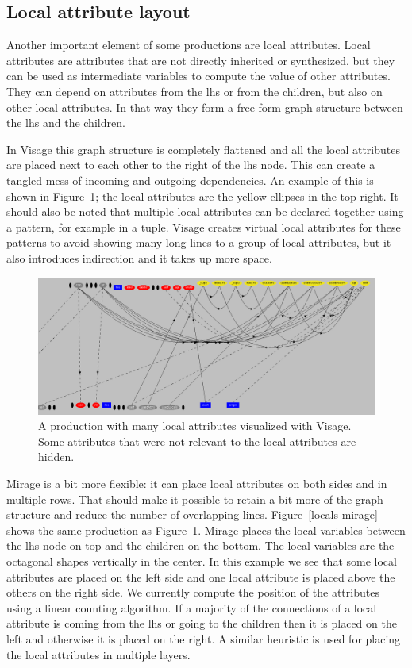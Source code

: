 \documentclass[11pt]{article}
\begin{document}
\subsection{Local attribute layout}

Another important element of some productions are local attributes. Local attributes are attributes that are not directly inherited or synthesized, but they can be used as intermediate variables to compute the value of other attributes. They can depend on attributes from the lhs or from the children, but also on other local attributes. In that way they form a free form graph structure between the lhs and the children. 

In Visage this graph structure is completely flattened and all the local attributes are placed next to each other to the right of the lhs node.  This can create a tangled mess of incoming and outgoing dependencies. An example of this is shown in Figure~\ref{locals-visage}; the local attributes are the yellow ellipses in the top right. It should also be noted that multiple local attributes can be declared together using a pattern, for example in a tuple. Visage creates virtual local attributes for these patterns to avoid showing many long lines to a group of local attributes, but it also introduces indirection and it takes up more space.

\begin{figure}[h]
  \centering
  \includegraphics[width=\linewidth]{locals-visage}
  \caption{A production with many local attributes visualized with Visage. Some attributes that were not relevant to the local attributes are hidden.}
  \label{locals-visage}
\end{figure}

Mirage is a bit more flexible: it can place local attributes on both sides and in multiple rows. That should make it possible to retain a bit more of the graph structure and reduce the number of overlapping lines. Figure~\ref{locals-mirage} shows the same production as Figure~\ref{locals-visage}. Mirage places the local variables between the lhs node on top and the children on the bottom. The local variables are the octagonal shapes vertically in the center. In this example we see that some local attributes are placed on the left side and one local attribute is placed above the others on the right side. We currently compute the position of the attributes using a linear counting algorithm. If a majority of the connections of a local attribute is coming from the lhs or going to the children then it is placed on the left and otherwise it is placed on the right. A similar heuristic is used for placing the local attributes in multiple layers.
\end{document}

